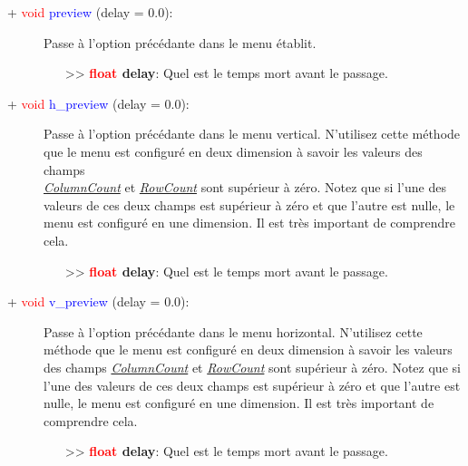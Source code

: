\documentclass[a4paper, 11pt]{article}
\begin{document}
	\begin{description}
		\item [+ \textcolor{red}{void} \textcolor{blue}{preview} (delay = 0.0):] Passe à l'option précédante 
		dans le menu établit.
		\begin{itemize}
			\item [>> \textbf{\textcolor{red}{float} delay}:] Quel est le temps mort avant le passage.\\
		\end{itemize}
	\end{description}
	\begin{description}
		\item [+ \textcolor{red}{void} \textcolor{blue}{h\_preview} (delay = 0.0):] Passe à l'option 
		précédante dans le menu vertical. N'utilisez cette méthode que le menu est configuré en deux 
		dimension à savoir les valeurs des champs \textit{\hyperlink{ccount}{\\ColumnCount}} et 
		\textit{\hyperlink{rcount}{RowCount}} sont supérieur à zéro. Notez que si l'une des valeurs de ces 
		deux champs est supérieur à zéro et que l'autre est nulle, le menu est configuré en une dimension. 
		Il est très important de comprendre cela.
		\begin{itemize}
			\item [>> \textbf{\textcolor{red}{float} delay}:] Quel est le temps mort avant le passage.\\
		\end{itemize}
	\end{description}
	\begin{description}
		\item [+ \textcolor{red}{void} \textcolor{blue}{v\_preview} (delay = 0.0):] Passe à l'option 
		précédante dans le menu horizontal. N'utilisez cette méthode que le menu est configuré en deux 
		dimension à savoir les valeurs des champs \textit{\hyperlink{ccount}{ColumnCount}} et 
		\textit{\hyperlink{rcount}{RowCount}} sont supérieur à zéro. Notez que si l'une des valeurs de ces 
		deux champs est supérieur à zéro et que l'autre est nulle, le menu est configuré en une dimension. 
		Il est très important de comprendre cela.
		\begin{itemize}
			\item [>> \textbf{\textcolor{red}{float} delay}:] Quel est le temps mort avant le passage.\\
		\end{itemize}
	\end{description}
\end{document}

